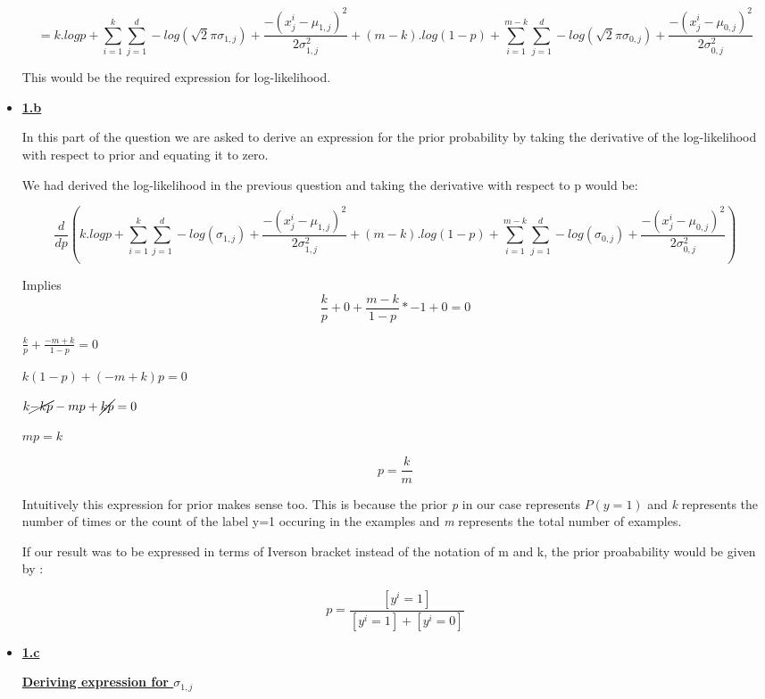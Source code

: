 \documentclass[11pt]{article}
\begin{document}
\begin{itemize}
		$$= k.log p + \sum_{i=1}^{k} \sum_{j=1}^{d} -log( \sqrt{2} \pi\sigma_{1,j}) +\frac{-(x_j^{i} - \mu_{1,j})^2}  {2\sigma_{1,j} ^2 } + (m-k) . log(1-p) + \sum_{i=1}^{m-k} \sum_{j=1}^{d} -log( \sqrt{2} \pi \sigma_{0,j}) + \frac{-(x_j^{i} - \mu_{0,j})^2}  {2\sigma_{0,j} ^2 }$$
		
	 	This would be the required expression for log-likelihood.
		
		\item[] \textbf{\underline{1.b}}
		
		In this part of the question we are asked to derive an expression for the prior probability by taking the derivative of the log-likelihood with respect to prior and equating it to zero.
		
		We had derived the log-likelihood in the previous question and taking the derivative with respect to p would be:
		
		$$ \frac{d}{dp} \left( k.log p + \sum_{i=1}^{k} \sum_{j=1}^{d} -log( \sigma_{1,j}) +\frac{-(x_j^{i} - \mu_{1,j})^2}  {2\sigma_{1,j} ^2 } + (m-k) . log(1-p) + \sum_{i=1}^{m-k} \sum_{j=1}^{d} -log(\sigma_{0,j}) + \frac{-(x_j^{i} - \mu_{0,j})^2}  {2\sigma_{0,j} ^2 }\right)$$
		
		Implies $$\frac{k}{p} + 0 + \frac{m-k}{1-p} * -1 + 0=0 $$
		
		$ \frac{k}{p} + \frac{-m+k}{1-p} = 0 $
		
		$ k(1-p)+ (-m+k)p = 0 $
		
		$k \cancel{-kp} -mp +\cancel{kp} =0 $
		
		$mp=k$
		
 $$\boxed{p=\frac{k}{m}}$$
 
Intuitively this expression for prior makes sense too. This is because the prior \emph{p} in our case represents $P(y=1)$ and \emph{k} represents the number of times or the count of the label y=1 occuring in the examples and \emph{m} represents the total number of examples. %
% 
  
  If our result was to be expressed in terms of Iverson bracket instead of the notation of m and k, the prior proabability would be given by :
  
  $$\boxed{p =\frac{[y^i=1]}{[y^i=1] + [y^i=0]}}$$
		
\item[] \textbf{\underline{1.c}}		

\textbf{\underline{Deriving expression for $\sigma_{1,j}$}}


\end{itemize}
\end{document}
